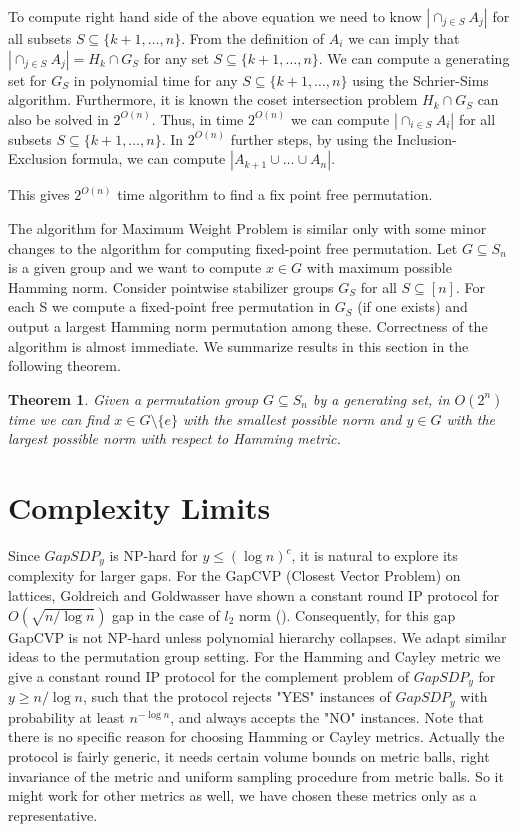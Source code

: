 \documentclass[12pt]{report}
\newtheorem{theorem}{Theorem}[section]
\begin{document}
To compute right hand side of the above equation we need to know $|\cap_{j \in S} A_j|$ for all subsets $S \subseteq \{k+1, \dots, n\}$. From the  definition of $A_i$ we can imply that $|\cap_{j \in S} A_j| = H_k \cap G_S$ for any set $S \subseteq \{k+1, \dots, n\}$. We can compute a generating set for $G_S$ in polynomial time for any $S \subseteq \{k+1, \dots, n\}$ using the Schrier-Sims algorithm. Furthermore, it is known the coset intersection problem $H_k \cap G_S$ can also be solved in $2^{O(n)}$. Thus, in time $2^{O(n)}$ we can compute $|\cap_{i \in S} A_i|$ for all subsets $S \subseteq \{k+1, \dots, n\}$. In $2^{O(n)}$ further steps, by using the Inclusion-Exclusion formula, we can compute $|A_{k+1} \cup \dots \cup A_n|$.

This gives $2^{O(n)}$ time algorithm to find a fix point free permutation.

The algorithm for Maximum Weight Problem is similar only with some minor changes to the algorithm for computing fixed-point free permutation. Let $G \subseteq S_n$ is a given group and we want to compute $x \in G$ with maximum possible Hamming norm. Consider pointwise stabilizer groups $G_S$ for all $S \subseteq [n]$. For each S we compute a fixed-point free permutation in $G_S$ (if one exists) and output a largest Hamming norm permutation among these. Correctness of the algorithm is almost immediate. We summarize results in this section in the following theorem.

\begin{theorem}
	Given a permutation group $G \subseteq S_n$ by a generating set, in $O(2^n)$ time we can find $x \in G \setminus \{e\}$ with the smallest possible norm and $y \in G$ with the largest possible norm with respect to Hamming metric.
\end{theorem}

\newpage


\chapter{Complexity Limits}

\indent \par Since $GapSDP_y$ is NP-hard for $y \leq (\log n)^c$, it is natural to explore its complexity for larger gaps. For the GapCVP (Closest Vector Problem) on lattices, Goldreich and Goldwasser have shown a constant round IP protocol for $O(\sqrt{n / \log n})$ gap in the case of $l_2$ norm (\cite{Arvind}). Consequently, for this gap GapCVP is not NP-hard unless polynomial hierarchy collapses. We adapt similar ideas to the permutation group setting.
For the Hamming and Cayley metric we give a constant round IP protocol for the complement problem of $GapSDP_y$ for $y \geq n / \log n$, such that the protocol rejects "YES" instances of $GapSDP_y$ with probability at least $n^{- \log n}$, and always accepts the "NO" instances. Note that there is no specific reason for choosing Hamming or Cayley metrics. Actually the protocol is fairly generic, it needs certain volume bounds on metric balls, right invariance of the metric and uniform sampling procedure from metric balls. So it might work for other metrics as well, we have chosen these metrics only as a representative.
\end{document}
